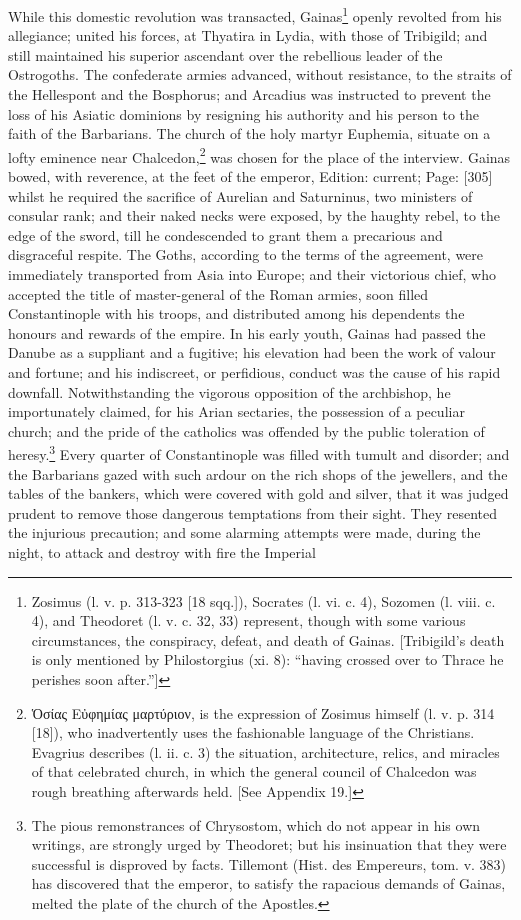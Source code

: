 While this domestic revolution was transacted, Gainas\footnote{Zosimus (l. v. p. 313-323 [18 sqq.]), Socrates (l. vi. c. 4), Sozomen (l. viii. c. 4), and Theodoret (l. v. c. 32, 33) represent, though with some various circumstances, the conspiracy, defeat, and death of Gainas. [Tribigild\texthebrew{}’s death is only mentioned by Philostorgius (xi. 8): \texthebrew{“}having crossed over to Thrace he perishes soon after.\texthebrew{}”]} openly revolted from his allegiance; united his forces, at Thyatira in Lydia, with those of Tribigild; and still maintained his superior ascendant over the rebellious leader of the Ostrogoths. The confederate armies advanced, without resistance, to the straits of the Hellespont and the Bosphorus; and Arcadius was instructed to prevent the loss of his Asiatic dominions by resigning his authority and his person to the faith of the Barbarians. The church of the holy martyr Euphemia, situate on a lofty eminence near Chalcedon,\footnote{\textgreek{\texthebrew{Ὁ}σίας Ε\texthebrew{ὐ}φημίας μαρτύριον}, is the expression of Zosimus himself (l. v. p. 314 [18]), who inadvertently uses the fashionable language of the Christians. Evagrius describes (l. ii. c. 3) the situation, architecture, relics, and miracles of that celebrated church, in which the general council of Chalcedon was rough breathing afterwards held. [See Appendix 19.]} was chosen for the place of the interview. Gainas bowed, with reverence, at the feet of the emperor, Edition: current; Page: [305] whilst he required the sacrifice of Aurelian and Saturninus, two ministers of consular rank; and their naked necks were exposed, by the haughty rebel, to the edge of the sword, till he condescended to grant them a precarious and disgraceful respite. The Goths, according to the terms of the agreement, were immediately transported from Asia into Europe; and their victorious chief, who accepted the title of master-general of the Roman armies, soon filled Constantinople with his troops, and distributed among his dependents the honours and rewards of the empire. In his early youth, Gainas had passed the Danube as a suppliant and a fugitive; his elevation had been the work of valour and fortune; and his indiscreet, or perfidious, conduct was the cause of his rapid downfall. Notwithstanding the vigorous opposition of the archbishop, he importunately claimed, for his Arian sectaries, the possession of a peculiar church; and the pride of the catholics was offended by the public toleration of heresy.\footnote{The pious remonstrances of Chrysostom, which do not appear in his own writings, are strongly urged by Theodoret; but his insinuation that they were successful is disproved by facts. Tillemont (Hist. des Empereurs, tom. v. 383) has discovered that the emperor, to satisfy the rapacious demands of Gainas, melted the plate of the church of the Apostles.} Every quarter of Constantinople was filled with tumult and disorder; and the Barbarians gazed with such ardour on the rich shops of the jewellers, and the tables of the bankers, which were covered with gold and silver, that it was judged prudent to remove those dangerous temptations from their sight. They resented the injurious precaution; and some alarming attempts were made, during the night, to attack and destroy with fire the Imperial 